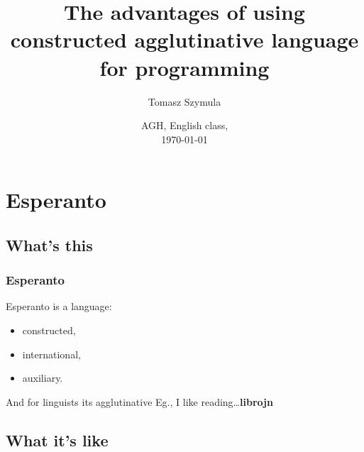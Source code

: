 \documentclass{beamer}
\title[Esperanto for programming]{The advantages of using constructed agglutinative language for programming}
\author{Tomasz Szymula}
\institute[PEJ]{Polish Esperanto-Youth}
\date[2014]{AGH, English class,\\ \today}
\begin{document}
  \frame{\titlepage}
 
  \section{Esperanto}
  \subsection{What's this} 
  
  \begin{frame}
  	\frametitle{Esperanto}
  	
  	\begin{block}{Esperanto is a language:}
  		\begin{itemize}
  			\item constructed,
			\item international,
			\item auxiliary.
		\end{itemize}
  	\end{block}
  	
  	\pause

	\begin{block}{And for linguists its agglutinative}
		Eg., I like reading\dots \textbf{\textcolor{antiquefuchsia}{libr}o\textcolor{ao(english)}{j}\textcolor{blue(pigment)}{n}}
	\end{block}  	
  	
  \end{frame}
 
  
  
  \subsection{What it's like}
  
%  	
%		
  
\end{document}

